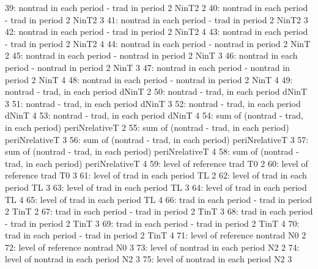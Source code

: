 \begin{Schunk}
\begin{Soutput}
39:    nontrad in each period - trad in period 2          NinT2      2
40:    nontrad in each period - trad in period 2          NinT2      3
41:    nontrad in each period - trad in period 2          NinT2      3
42:    nontrad in each period - trad in period 2          NinT2      4
43:    nontrad in each period - trad in period 2          NinT2      4
44: nontrad in each period - nontrad in period 2           NinT      2
45: nontrad in each period - nontrad in period 2           NinT      3
46: nontrad in each period - nontrad in period 2           NinT      3
47: nontrad in each period - nontrad in period 2           NinT      4
48: nontrad in each period - nontrad in period 2           NinT      4
49:               nontrad - trad, in each period          dNinT      2
50:               nontrad - trad, in each period          dNinT      3
51:               nontrad - trad, in each period          dNinT      3
52:               nontrad - trad, in each period          dNinT      4
53:               nontrad - trad, in each period          dNinT      4
54:      sum of (nontrad - trad, in each period) periNrelativeT      2
55:      sum of (nontrad - trad, in each period) periNrelativeT      3
56:      sum of (nontrad - trad, in each period) periNrelativeT      3
57:      sum of (nontrad - trad, in each period) periNrelativeT      4
58:      sum of (nontrad - trad, in each period) periNrelativeT      4
59:                      level of reference trad             T0      2
60:                      level of reference trad             T0      3
61:                 level of trad in each period             TL      2
62:                 level of trad in each period             TL      3
63:                 level of trad in each period             TL      3
64:                 level of trad in each period             TL      4
65:                 level of trad in each period             TL      4
66:       trad in each period - trad in period 2           TinT      2
67:       trad in each period - trad in period 2           TinT      3
68:       trad in each period - trad in period 2           TinT      3
69:       trad in each period - trad in period 2           TinT      4
70:       trad in each period - trad in period 2           TinT      4
71:                   level of reference nontrad             N0      2
72:                   level of reference nontrad             N0      3
73:              level of nontrad in each period             N2      2
74:              level of nontrad in each period             N2      3
75:              level of nontrad in each period             N2      3

\end{Soutput}
\end{Schunk}
